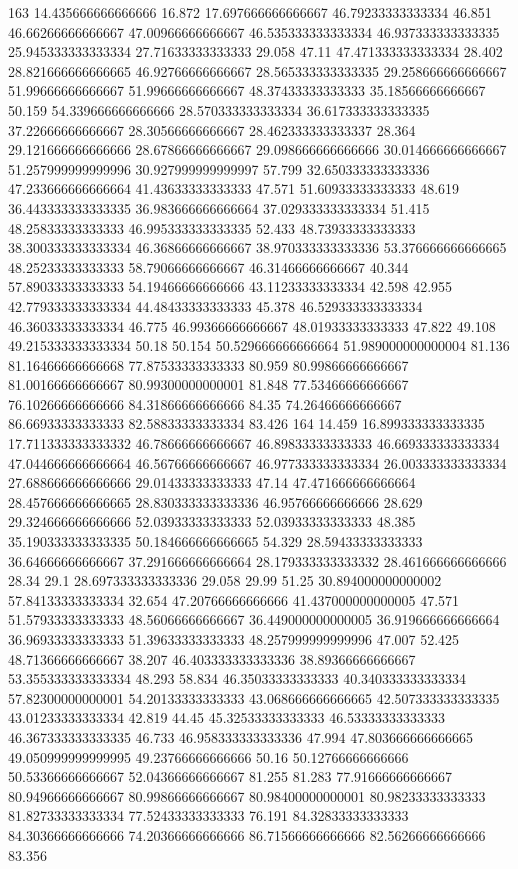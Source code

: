 163 14.435666666666666 16.872 17.697666666666667 46.79233333333334 46.851 46.66266666666667 47.00966666666667 46.535333333333334 46.937333333333335 25.945333333333334 27.71633333333333 29.058 47.11 47.471333333333334 28.402 28.821666666666665 46.92766666666667 28.565333333333335 29.258666666666667 51.99666666666667 51.99666666666667 48.37433333333333 35.18566666666667 50.159 54.339666666666666 28.570333333333334 36.617333333333335 37.22666666666667 28.30566666666667 28.462333333333337 28.364 29.121666666666666 28.67866666666667 29.098666666666666 30.014666666666667 51.257999999999996 30.927999999999997 57.799 32.650333333333336 47.233666666666664 41.43633333333333 47.571 51.60933333333333 48.619 36.443333333333335 36.983666666666664 37.029333333333334 51.415 48.25833333333333 46.995333333333335 52.433 48.73933333333333 38.300333333333334 46.36866666666667 38.970333333333336 53.376666666666665 48.25233333333333 58.79066666666667 46.31466666666667 40.344 57.89033333333333 54.19466666666666 43.11233333333334 42.598 42.955 42.779333333333334 44.48433333333333 45.378 46.529333333333334 46.36033333333334 46.775 46.99366666666667 48.01933333333333 47.822 49.108 49.215333333333334 50.18 50.154 50.529666666666664 51.989000000000004 81.136 81.16466666666668 77.87533333333333 80.959 80.99866666666667 81.00166666666667 80.99300000000001 81.848 77.53466666666667 76.10266666666666 84.31866666666666 84.35 74.26466666666667 86.66933333333333 82.58833333333334 83.426
164 14.459 16.899333333333335 17.711333333333332 46.78666666666667 46.89833333333333 46.669333333333334 47.044666666666664 46.56766666666667 46.977333333333334 26.003333333333334 27.688666666666666 29.01433333333333 47.14 47.471666666666664 28.457666666666665 28.830333333333336 46.95766666666666 28.629 29.324666666666666 52.03933333333333 52.03933333333333 48.385 35.190333333333335 50.184666666666665 54.329 28.59433333333333 36.64666666666667 37.291666666666664 28.179333333333332 28.461666666666666 28.34 29.1 28.697333333333336 29.058 29.99 51.25 30.894000000000002 57.84133333333334 32.654 47.20766666666666 41.437000000000005 47.571 51.57933333333333 48.56066666666667 36.449000000000005 36.919666666666664 36.96933333333333 51.39633333333333 48.257999999999996 47.007 52.425 48.71366666666667 38.207 46.403333333333336 38.89366666666667 53.355333333333334 48.293 58.834 46.35033333333333 40.340333333333334 57.82300000000001 54.20133333333333 43.068666666666665 42.507333333333335 43.01233333333334 42.819 44.45 45.32533333333333 46.53333333333333 46.367333333333335 46.733 46.958333333333336 47.994 47.803666666666665 49.050999999999995 49.23766666666666 50.16 50.12766666666666 50.53366666666667 52.04366666666667 81.255 81.283 77.91666666666667 80.94966666666667 80.99866666666667 80.98400000000001 80.98233333333333 81.82733333333334 77.52433333333333 76.191 84.32833333333333 84.30366666666666 74.20366666666666 86.71566666666666 82.56266666666666 83.356
